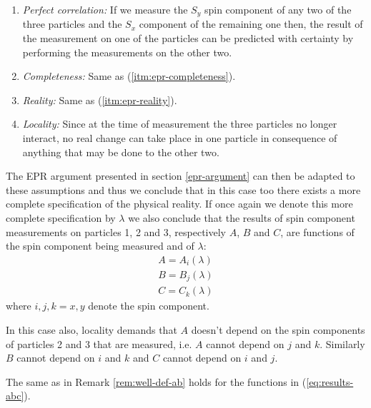 \begin{enumerate}[label=(\alph*$'$)]
\item \label{itm:epr-perfect-correlation'} \textit{Perfect correlation:} If we measure the $S_y$ spin component of any two of the three particles and the $S_x$ component of the remaining one then, the result of the measurement on one of the particles can be predicted with certainty by performing the measurements on the other two.
\item \label{itm:epr-completeness'} \textit{Completeness:} Same as (\ref{itm:epr-completeness}).
\item \label{itm:epr-reality'} \textit{Reality:} Same as (\ref{itm:epr-reality}).
\item \label{itm:epr-locality'} \textit{Locality:} Since at the time of measurement the three particles no longer interact, no real change can take place in one particle in consequence of anything that may be done to the other two.
\end{enumerate}
The EPR argument presented in section \ref{epr-argument} can then be adapted to these assumptions and thus we conclude that in this case too there exists a more complete specification of the physical reality. If once again we denote this more complete specification by $\lambda$ we also conclude that the results of spin component measurements on particles 1, 2 and 3, respectively $A$, $B$ and $C$, are functions of the spin component being measured and of $\lambda$:%
\begin{equation}
  \label{eq:results-abc}
  \begin{split}
      A = A_i(\lambda)\\
      B = B_j(\lambda)\\
      C = C_k(\lambda)
  \end{split}
\end{equation}
where $i, j, k = x, y$ denote the spin component.%

In this case also, locality demands that $A$ doesn't depend on the spin components of particles 2 and 3 that are measured, i.e. $A$ cannot depend on $j$ and $k$. Similarly $B$ cannot depend on $i$ and $k$ and $C$ cannot depend on $i$ and $j$.

\begin{remark}
  \label{rem:well-def-abc}
  The same as in Remark \ref{rem:well-def-ab} holds for the functions in (\ref{eq:results-abc}).
\end{remark}


